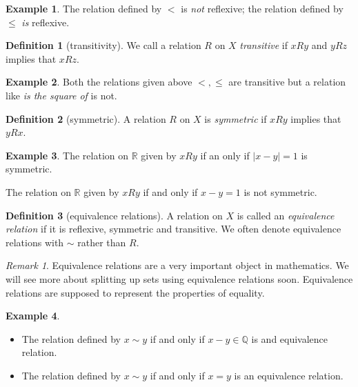 \documentclass[
]{book}
\theoremstyle{definition}
\newtheorem{definition}{Definition}[chapter]
\theoremstyle{definition}
\newtheorem{example}{Example}[chapter]
\theoremstyle{definition}
\theoremstyle{definition}
\theoremstyle{remark}
\newtheorem*{remark}{Remark}
\begin{document}
\begin{example}
The relation defined by \(<\) is \emph{not} reflexive; the relation defined by \(\leq\) \emph{is} reflexive.
\end{example}

\begin{definition}[transitivity]
We call a relation \(R\) on \(X\) \emph{transitive} if \(x R y\) and \(y R z\) implies that \(x R z\).
\end{definition}

\begin{example}
Both the relations given above \(<,\leq\) are transitive but a relation like \emph{is the square of} is not.
\end{example}

\begin{definition}[symmetric]
A relation \(R\) on \(X\) is \emph{symmetric} if \(x R y\) implies that \(y R x\).
\end{definition}

\begin{example}
The relation on \(\mathbb{R}\) given by \(xR y\) if an only if \(|x-y|=1\) is symmetric.

The relation on \(\mathbb{R}\) given by \(x R y\) if and only if \(x-y=1\) is not symmetric.
\end{example}

\begin{definition}[equivalence relations]
A relation on \(X\) is called an \emph{equivalence relation} if it is reflexive, symmetric and transitive. We often denote equivalence relations with \(\sim\) rather than \(R\).
\end{definition}

\begin{remark}
Equivalence relations are a very important object in mathematics. We will see more about splitting up sets using equivalence relations soon. Equivalence relations are supposed to represent the properties of equality.
\end{remark}

\begin{example}

\begin{itemize}
\item
  The relation defined by \(x \sim y\) if and only if \(x-y \in \mathbb{Q}\) is and equivalence relation.
\item
  The relation defined by \(x \sim y\) if and only if \(x=y\) is an equivalence relation.
\end{itemize}

\end{example}
\end{document}

